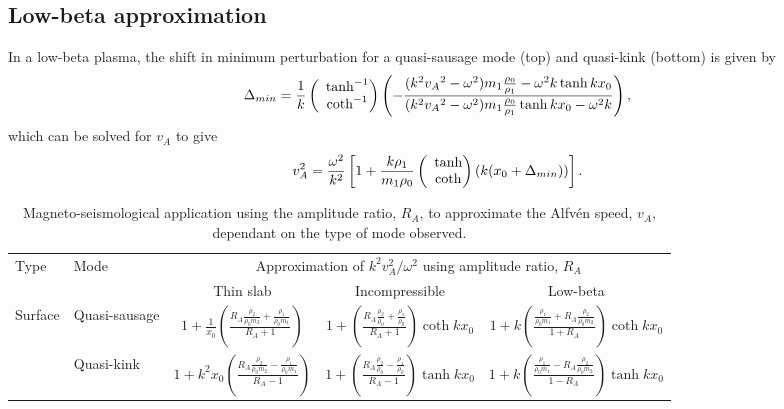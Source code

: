 \documentclass[namedreferences]{solarphysics}
\numberwithin{equation}{section}
\begin{document}
\begin{article}
\subsection{Low-beta approximation}
In a low-beta plasma, the shift in minimum perturbation for a quasi-sausage mode (top) and quasi-kink (bottom) is given by
\begin{equation}
\Delta_{min} = \frac{1}{k}\left(\hspace{-0.07in}\begin{matrix} &\tanh^{-1} \\ &\coth^{-1} \end{matrix}\right)\left(-\frac{(k^2{v_A}^2-\omega^2)m_1\frac{\rho_0}{\rho_1} - \omega^2k\tanh{kx_0}}{(k^2{v_A}^2-\omega^2)m_1\frac{\rho_0}{\rho_1}\tanh{kx_0} - \omega^2k}\right),
\end{equation}
which can be solved for $v_A$ to give
\begin{equation}
v_A^2 = \frac{\omega^2}{k^2}\left[1 + \frac{k\rho_1}{m_1\rho_0}\left(\hspace{-0.07in}\begin{matrix} &\tanh \\ &\coth \end{matrix}\right)(k(x_0 + \Delta_{min}))\right].
\end{equation}

\begin{landscape}


\begin{table}
\caption{Magneto-seismological application using the amplitude ratio, $R_A$, to approximate the Alfv\'{e}n speed, $v_A$, dependant on the type of mode observed.}
\begin{tabular}{llccc}
  \toprule
Type & Mode & \multicolumn{3}{c}{Approximation of $k^2v_A^2 / \omega^2$ using amplitude ratio, $R_A$} \\
\cmidrule(lr){3-5}
	 &	    & \multicolumn{1}{c}{Thin slab} & \multicolumn{1}{c}{Incompressible} & \multicolumn{1}{c}{Low-beta} \\
  \midrule
\multirow{2}{*}{Surface} & Quasi-sausage & $ 1 + \frac{1}{x_0}\left(\frac{R_A\frac{\rho_2}{\rho_0m_2} + \frac{\rho_1}{\rho_0m_1}}{R_A + 1}\right) $ & $ 1 + \left( \frac{R_A \frac{\rho_2}{\rho_0} + \frac{\rho_1}{\rho_0}}{R_A + 1} \right) \coth{kx_0} $ & $ 1 + k \left( \frac{ \frac{\rho_1}{\rho_0m_1} + R_A\frac{\rho_2}{\rho_0m_2}}{1 + R_A} \right) \coth{kx_0} $ \\
						   & Quasi-kink	   & $ 1 + k^2x_0\left(\frac{R_A\frac{\rho_2}{\rho_0m_2} - \frac{\rho_1}{\rho_0m_1}}{R_A - 1}\right) $ & $ 1 + \left( \frac{R_A \frac{\rho_2}{\rho_0} - \frac{\rho_1}{\rho_0}}{R_A - 1} \right) \tanh{kx_0} $ & $ 1 + k \left( \frac{ \frac{\rho_1}{\rho_0m_1} - R_A\frac{\rho_2}{\rho_0m_2}}{1 - R_A} \right) \tanh{kx_0} $ \\
  \bottomrule
\end{tabular} \label{table: amp ratio}
\end{table}




\end{landscape}
\end{article}
\end{document}
